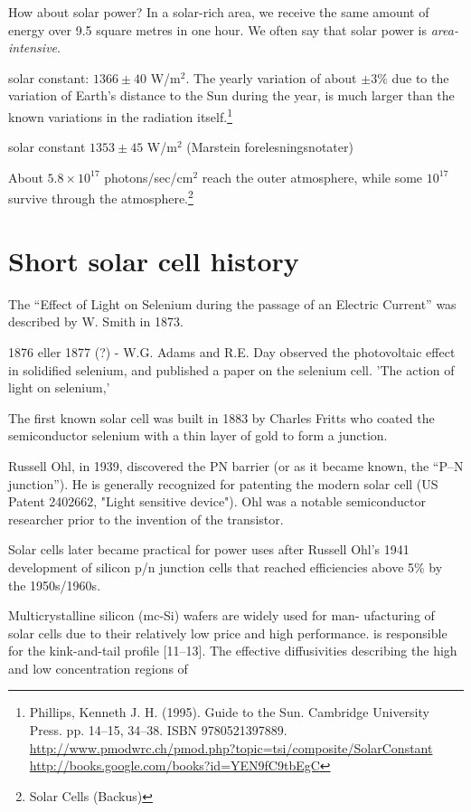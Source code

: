 \documentclass[11pt,bibliography=totoc,index=totoc]{scrbook}   %
\begin{document}
How about solar power? In a solar-rich area, we receive the same amount of energy 
over 9.5 square metres in one hour. We often say that solar power is 
\emph{area-intensive}.


solar constant: $1366\pm 40$ W/m$^2$. The yearly variation of about $\pm 3\%$ 
due to the variation of Earth's distance to the Sun during the year, is much
larger than the known variations in the radiation itself.\footnote{
Phillips, Kenneth J. H. (1995). Guide to the Sun. Cambridge University Press. 
pp. 14–15, 34–38. ISBN 9780521397889.
\url{http://www.pmodwrc.ch/pmod.php?topic=tsi/composite/SolarConstant}
\url{http://books.google.com/books?id=YEN9fC9tbEgC}
}

solar constant $1353\pm 45$ W/m$^2$ (Marstein forelesningsnotater)

About $5.8\times 10^{17}$ photons/sec/cm$^2$ reach the outer atmosphere, while
some $10^{17}$ survive through the atmosphere.\footnote{Solar Cells (Backus)}


\section{Short solar cell history}

The ``Effect of Light on Selenium during the passage of an Electric Current''
was described by W. Smith in 1873\cite{Smith:1873}.

1876 eller 1877 (?) - W.G. Adams and R.E. Day observed the photovoltaic effect in solidified 
selenium, and published a paper on the selenium cell. 'The action of light 
on selenium,'\cite{Adams:1876}

The first known solar cell was built in 1883 by Charles Fritts who coated the
semiconductor selenium with a thin layer of gold to form a junction.

Russell Ohl, in 1939, discovered the PN barrier (or as it became known, 
the “P–N junction”). He is generally recognized for patenting the modern solar 
cell (US Patent 2402662, "Light sensitive device"). Ohl was a notable 
semiconductor researcher prior to the invention of the transistor. 

Solar cells later became practical for power uses after Russell Ohl's 1941 
development of silicon p/n junction cells that reached efficiencies above 
5\% by the 1950s/1960s.

Multicrystalline silicon (mc-Si) wafers are widely used for man- 
ufacturing of solar cells due to their relatively low price and high 
performance. is responsible for the kink-and-tail profile [11–13]. The effective 
diffusivities describing the high and low concentration regions of 
\end{document}
